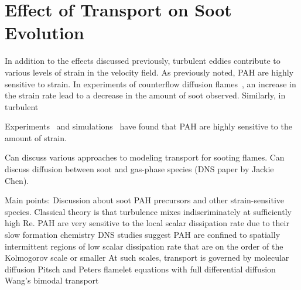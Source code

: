 \section{Effect of Transport on Soot Evolution}
\label{sec:intro:transport}

In addition to the effects discussed previously, turbulent eddies contribute to various levels of strain in the velocity field. As previously noted, PAH are highly sensitive to strain. In experiments of counterflow diffusion flames~\cite{}, an increase in the strain rate lead to a decrease in the amount of soot observed. Similarly, in turbulent 

Experiments~\cite{} and simulations~\cite{} have found that PAH are highly sensitive to the amount of strain.

Can discuss various approaches to modeling transport for sooting flames. Can discuss diffusion between soot and gas-phase species (DNS paper by Jackie Chen).

Main points:
Discussion about soot PAH precursors and other strain-sensitive species.
Classical theory is that turbulence mixes indiscriminately at sufficiently high Re.
PAH are very sensitive to the local scalar dissipation rate due to their slow formation chemistry
DNS studies suggest PAH are confined to spatially intermittent regions of low scalar dissipation rate that are on the order of the Kolmogorov scale or smaller
At such scales, transport is governed by molecular diffusion
Pitsch and Peters flamelet equations with full differential diffusion
Wang's bimodal transport
